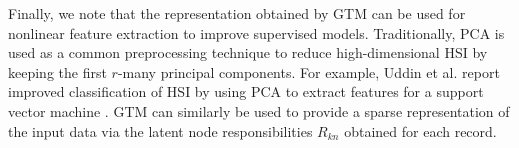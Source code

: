 Finally, we note that the representation obtained by  GTM can be used for
nonlinear feature extraction to improve supervised models. Traditionally, PCA is
used as a common preprocessing technique to reduce high-dimensional HSI by
keeping the first $r$-many principal components. For example, Uddin et al.
report improved classification of HSI by using PCA to extract features for a
support vector machine \cite{uddin2021pca}.  GTM can similarly be used to
provide a sparse representation of the input data via the latent node
responsibilities $R_{kn}$ obtained for each record.

